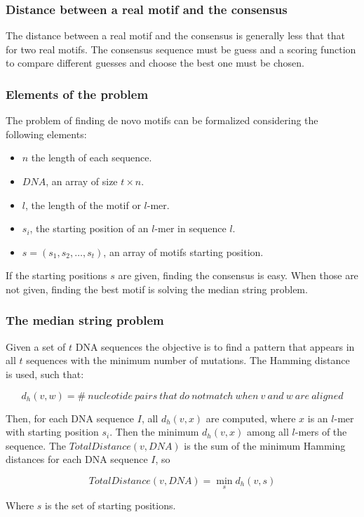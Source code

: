 		\subsubsection{Distance between a real motif and the consensus}
		The distance between a real motif and the consensus is generally less that that for two real motifs.
		The consensus sequence must be guess and a scoring function to compare different guesses and choose the best one must be chosen.

		\subsubsection{Elements of the problem}
		The problem of finding de novo motifs can be formalized considering the following elements:

		\begin{multicols}{2}
			\begin{itemize}
				\item $n$ the length of each sequence.
				\item $DNA$, an array of size $t\times n$.
				\item $l$, the length of the motif or $l$-mer.
				\item $s_i$, the starting position of an $l$-mer in sequence $l$.
				\item $s = (s_1, s_2, \dots, s_t)$, an array of motifs starting position.
			\end{itemize}
		\end{multicols}

		If the starting positions $s$ are given, finding the consensus is easy.
		When those are not given, finding the best motif is solving the median string problem.

		\subsubsection{The median string problem}
		Given a set of $t$ DNA sequences the objective is to find a pattern that appears in all $t$ sequences with the minimum number of mutations.
		The Hamming distance is used, such that:

		$$d_h(v, w) = \#\ nucleotide\ pairs\ that\ do\ not match\ when\ v\ and\ w\ are\ aligned$$

		Then, for each DNA sequence $I$, all $d_h(v,x)$ are computed, where $x$ is an $l$-mer with starting position $s_i$.
		Then the minimum $d_h(v,x)$ among all $l$-mers of the sequence.
		The $TotalDistance(v,DNA)$ is the sum of the minimum Hamming distances for each DNA sequence $I$, so

		$$TotalDistance(v,DNA) = \min\limits_s d_h(v,s)$$

		Where $s$ is the set of starting positions.
